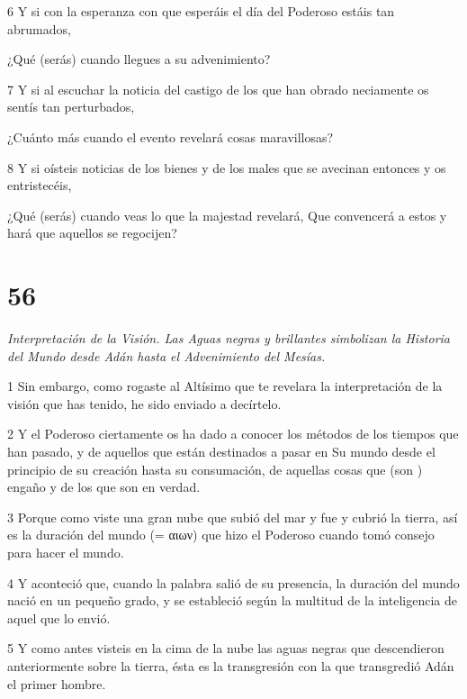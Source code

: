\par 6 Y si con la esperanza con que esperáis el día del Poderoso estáis tan abrumados,

\par ¿Qué (serás) cuando llegues a su advenimiento?

\par 7 Y si al escuchar la noticia del castigo de los que han obrado neciamente os sentís tan perturbados,

\par ¿Cuánto más cuando el evento revelará cosas maravillosas?

\par 8 Y si oísteis noticias de los bienes y de los males que se avecinan entonces y os entristecéis,

\par ¿Qué (serás) cuando veas lo que la majestad revelará, Que convencerá a estos y hará que aquellos se regocijen?

\chapter{56}

\par \textit{Interpretación de la Visión. Las Aguas negras y brillantes simbolizan la Historia del Mundo desde Adán hasta el Advenimiento del Mesías.}


\par 1 Sin embargo, como rogaste al Altísimo que te revelara la interpretación de la visión que has tenido, he sido enviado a decírtelo.

\par 2 Y el Poderoso ciertamente os ha dado a conocer los métodos de los tiempos que han pasado, y de aquellos que están destinados a pasar en Su mundo desde el principio de su creación hasta su consumación, de aquellas cosas que (son ) engaño y de los que son en verdad.

\par 3 Porque como viste una gran nube que subió del mar y fue y cubrió la tierra, así es la duración del mundo (= αιων) que hizo el Poderoso cuando tomó consejo para hacer el mundo.

\par 4 Y aconteció que, cuando la palabra salió de su presencia, la duración del mundo nació en un pequeño grado, y se estableció según la multitud de la inteligencia de aquel que lo envió.

\par 5 Y como antes visteis en la cima de la nube las aguas negras que descendieron anteriormente sobre la tierra, ésta es la transgresión con la que transgredió Adán el primer hombre.

